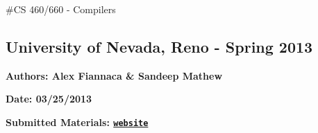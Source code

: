 \#\-C\-S 460/660 -\/ Compilers \subsection*{University of Nevada, Reno -\/ Spring 2013}

{\bfseries Authors\-: Alex Fiannaca \& Sandeep Mathew}

{\bfseries Date\-: 03/25/2013}

{\bfseries Submitted Materials\-: \href{http://afiannac2.github.com/cs660/}{\tt website}} 